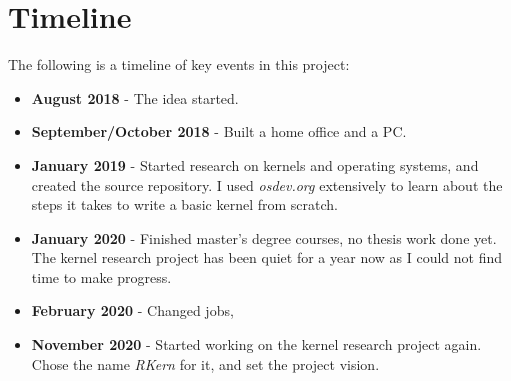 \section*{Timeline}
The following is a timeline of key events in this project:
\begin{itemize}
    \item \textbf{August 2018} - The idea started.
    \item \textbf{September/October 2018} - Built a home office and a PC.
    \item \textbf{January 2019} - Started research on kernels and operating systems, and created the source repository. I used \textit{osdev.org}\cite{osdev} extensively to learn about the steps it takes to write a basic kernel from scratch.
    \item \textbf{January 2020} - Finished master's degree courses, no thesis work done yet. The kernel research project has been quiet for a year now as I could not find time to make progress.
    \item \textbf{February 2020} - Changed jobs,
    \item \textbf{November 2020} - Started working on the kernel research project again. Chose the name \textit{RKern} for it, and set the project vision.
\end{itemize}